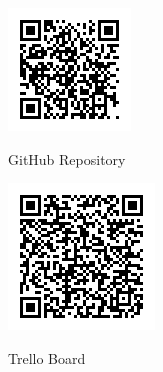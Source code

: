 \documentclass[a4paper, 12pt]{article}
\begin{document}
      \begin{figure}[h]
        \centering
        \begin{minipage}[t]{0.45\textwidth}
          \centering
          \href{https://github.com/EmreArapcicUevak/Smart-Attendance-System}{\includegraphics[width=0.8\linewidth]{../../GlobalImages/github-QR-code.png}}
          \caption{GitHub Repository}
        \end{minipage}
        \hfill
        \begin{minipage}[t]{0.45\textwidth}
          \centering
          \href{https://trello.com/invite/b/67d55d04d8b354319f1b1db9/ATTI06ed93867f846f425d572d2018e2bb8804A6E2FF/smart-attendance-ius}{\includegraphics[width=0.8\linewidth]{../../GlobalImages/trello-QR-code.png}}
          \caption{Trello Board}
        \end{minipage}
      \end{figure}
\end{document}

